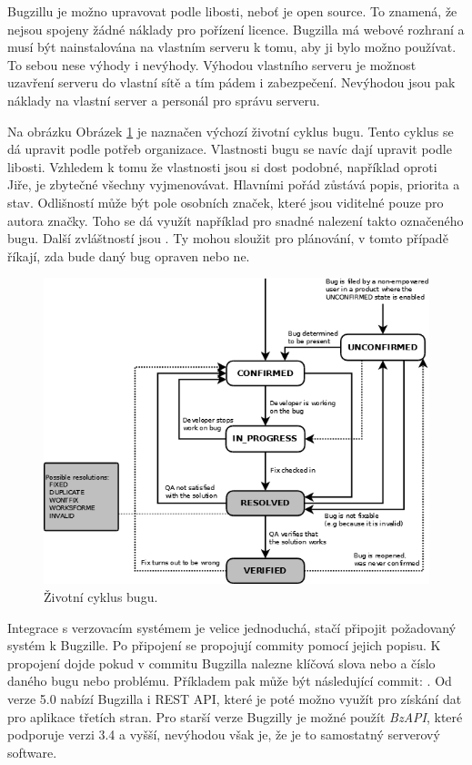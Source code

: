\documentclass[czech,DP]{thesiskiv}
\begin{document}
Bugzillu je možno upravovat podle libosti, neboť je open source. To znamená, že nejsou spojeny žádné náklady pro pořízení licence. Bugzilla má webové rozhraní a musí být nainstalována na vlastním serveru k tomu, aby ji bylo možno používat. To sebou nese výhody i nevýhody. Výhodou vlastního serveru je možnost uzavření serveru do vlastní sítě a tím pádem i zabezpečení. Nevýhodou jsou pak náklady na vlastní server a personál pro správu serveru.

Na obrázku Obrázek \ref{pic:bzLifecycle} je naznačen výchozí životní cyklus bugu. Tento cyklus se dá upravit podle potřeb organizace. Vlastnosti bugu se navíc dají upravit podle libosti.  Vzhledem k tomu že vlastnosti jsou si dost podobné, například oproti Jiře, je zbytečné všechny vyjmenovávat. Hlavními pořád zůstává popis, priorita a stav. Odlišností může být pole osobních značek, které jsou viditelné pouze pro autora značky. Toho se dá využít například pro snadné nalezení takto označeného bugu. Další zvláštností jsou . Ty mohou sloužit pro plánování, v tomto případě říkají, zda bude daný bug opraven nebo ne. 
\begin{figure}[!ht]
\begin{center}
	\includegraphics[width=1.0\textwidth]{Pic/bzLifecycle.png}
\end{center}
\label{pic:bzLifecycle}
\caption{Životní cyklus bugu. \citep{bugzillabugtracking}}
\end{figure}

Integrace s verzovacím systémem je velice jednoduchá, stačí připojit požadovaný systém k Bugzille. Po připojení se propojují commity pomocí jejich popisu. K propojení dojde pokud v commitu Bugzilla nalezne klíčová slova  nebo  a číslo daného bugu nebo problému. Příkladem pak může být následující commit: . Od verze 5.0 nabízí Bugzilla i REST API, které je poté možno využít pro získání dat pro aplikace třetích stran. Pro starší verze Bugzilly je možné použít \textit{BzAPI}, které podporuje verzi 3.4 a vyšší, nevýhodou však je, že je to samostatný serverový software.
\end{document}
